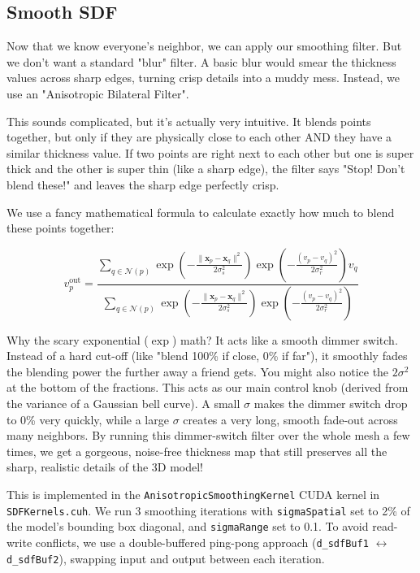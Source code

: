 \subsection{Smooth SDF}

Now that we know everyone's neighbor, we can apply our smoothing filter. But we don't want a standard "blur" filter. A basic blur would smear the thickness values across sharp edges, turning crisp details into a muddy mess. Instead, we use an "Anisotropic Bilateral Filter". 

This sounds complicated, but it's actually very intuitive. It blends points together, but only if they are physically close to each other AND they have a similar thickness value. If two points are right next to each other but one is super thick and the other is super thin (like a sharp edge), the filter says "Stop! Don't blend these!" and leaves the sharp edge perfectly crisp. 

We use a fancy mathematical formula to calculate exactly how much to blend these points together:

\begin{equation}
    v_p^{\mathrm{out}} = \frac{\sum_{q \in \mathcal{N}(p)} \exp\!\left(-\frac{\|\mathbf{x}_p - \mathbf{x}_q\|^2}{2\sigma_s^2}\right) \exp\!\left(-\frac{(v_p - v_q)^2}{2\sigma_r^2}\right) v_q}{\sum_{q \in \mathcal{N}(p)} \exp\!\left(-\frac{\|\mathbf{x}_p - \mathbf{x}_q\|^2}{2\sigma_s^2}\right) \exp\!\left(-\frac{(v_p - v_q)^2}{2\sigma_r^2}\right)}
\end{equation}

Why the scary exponential ($\exp$) math? It acts like a smooth dimmer switch. Instead of a hard cut-off (like "blend 100\% if close, 0\% if far"), it smoothly fades the blending power the further away a friend gets. You might also notice the $2\sigma^2$ at the bottom of the fractions. This acts as our main control knob (derived from the variance of a Gaussian bell curve). A small $\sigma$ makes the dimmer switch drop to 0\% very quickly, while a large $\sigma$ creates a very long, smooth fade-out across many neighbors. By running this dimmer-switch filter over the whole mesh a few times, we get a gorgeous, noise-free thickness map that still preserves all the sharp, realistic details of the 3D model!

This is implemented in the \texttt{AnisotropicSmoothingKernel} CUDA kernel in \texttt{SDFKernels.cuh}. We run 3 smoothing iterations with \texttt{sigmaSpatial} set to 2\% of the model's bounding box diagonal, and \texttt{sigmaRange} set to 0.1. To avoid read-write conflicts, we use a double-buffered ping-pong approach (\texttt{d\_sdfBuf1} $\leftrightarrow$ \texttt{d\_sdfBuf2}), swapping input and output between each iteration.
